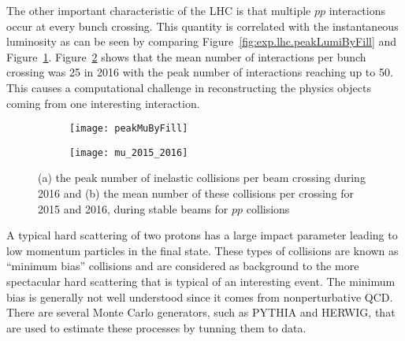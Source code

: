 The other important characteristic of the LHC is that multiple $pp$ interactions occur at every 
bunch crossing.  This quantity is correlated with the instantaneous luminosity as can be seen 
by comparing Figure~\ref{fig:exp.lhc.peakLumiByFill} and Figure~\ref{fig:exp.lhc.peakMuByFill}. Figure~\ref{fig:exp.mu_2015_2016}
shows that the mean number of interactions per bunch crossing was 25 in 2016 with the peak number of interactions 
reaching up to 50. This causes a computational challenge in reconstructing the physics objects coming from 
one interesting interaction.
\begin{figure}[!htb]
\centering
\begin{subfigure}[t]{0.48\textwidth}
\texttt{[image: peakMuByFill]}
\subcaption{}
\label{fig:exp.lhc.peakMuByFill}
\end{subfigure}
\begin{subfigure}[t]{0.48\textwidth}
\texttt{[image: mu\_2015\_2016]}
\subcaption{}
\label{fig:exp.mu_2015_2016}
\end{subfigure}
\vspace{-0.25cm}
\caption{(a) the peak number of inelastic collisions per beam crossing during 2016 
  and (b) the mean number of these collisions per crossing for 2015 and 2016, during stable beams for $pp$ collisions}
\label{fig:exp.lhc.int}
\end{figure} 
A typical hard scattering of two protons has a large impact parameter leading to low momentum particles in the final 
state. These types of collisions are known as ``minimum bias'' collisions and are considered as background to 
the more spectacular hard scattering that is typical of an interesting event. 
The minimum bias is generally not well understood since it comes from nonperturbative QCD. There are several Monte Carlo generators, such as {\sc PYTHIA} and
{\sc HERWIG}, that are used to estimate these processes by tunning them to 
data.



